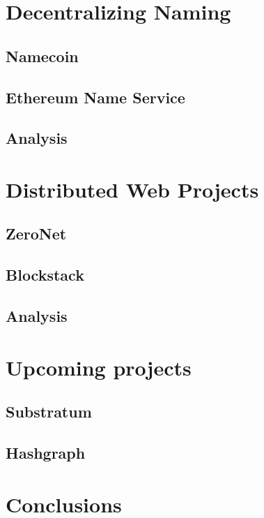 \documentclass[mscthesis]{usiinfthesis}
\begin{document}
\chapter{Decentralizing Naming}

\section{Namecoin}\label{proj:namecoin}

\section{Ethereum Name Service}\label{proj:ens}

\section{Analysis}


\chapter{Distributed Web Projects}

\section{ZeroNet}\label{proj:zeronet}

\section{Blockstack}\label{proj:blockstack}

\section{Analysis}


\chapter{Upcoming projects}

\section{Substratum}

\section{Hashgraph}


\chapter{Conclusions}
\end{document}
